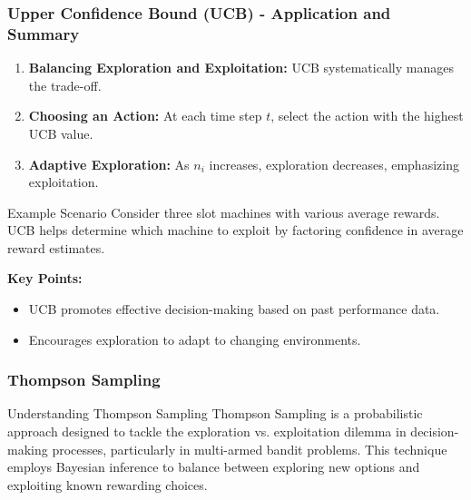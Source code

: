 \documentclass[aspectratio=169]{beamer}
\begin{document}
\begin{frame}[fragile]
    \frametitle{Upper Confidence Bound (UCB) - Application and Summary}
    \begin{enumerate}
        \item \textbf{Balancing Exploration and Exploitation:} UCB systematically manages the trade-off.
        \item \textbf{Choosing an Action:} At each time step $t$, select the action with the highest UCB value.
        \item \textbf{Adaptive Exploration:} As $n_i$ increases, exploration decreases, emphasizing exploitation.
    \end{enumerate}

    \begin{block}{Example Scenario}
        Consider three slot machines with various average rewards. UCB helps determine which machine to exploit by factoring confidence in average reward estimates.
    \end{block}

    \textbf{Key Points:}
    \begin{itemize}
        \item UCB promotes effective decision-making based on past performance data.
        \item Encourages exploration to adapt to changing environments.
    \end{itemize}
\end{frame}

\begin{frame}[fragile]
    \frametitle{Thompson Sampling}
    \begin{block}{Understanding Thompson Sampling}
        Thompson Sampling is a probabilistic approach designed to tackle the exploration vs. exploitation dilemma in decision-making processes, particularly in multi-armed bandit problems. This technique employs Bayesian inference to balance between exploring new options and exploiting known rewarding choices.
    \end{block}
\end{frame}
\end{document}
